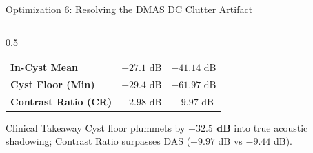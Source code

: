 \documentclass[aspectratio=169,10pt]{beamer}
\begin{document}
\begin{frame}{Optimization 6: Resolving the DMAS DC Clutter Artifact}
\begin{columns}[T]
\begin{column}{0.5\textwidth}
\begin{table}
\begin{tabular}{@{}lcc@{}}
          \midrule
          \textbf{In-Cyst Mean} & $-27.1\text{ dB}$ & \textbf{$-41.14\text{ dB}$} \\
          \textbf{Cyst Floor (Min)} & $-29.4\text{ dB}$ & \textbf{$-61.97\text{ dB}$} \\
          \textbf{Contrast Ratio (CR)} & $-2.98\text{ dB}$ & \textbf{$-9.97\text{ dB}$} \\
          \bottomrule
        \end{tabular}
      \end{table}
      \begin{alertblock}{Clinical Takeaway}
        \scriptsize
        Cyst floor plummets by \textbf{$-32.5$ dB} into true acoustic shadowing; Contrast Ratio surpasses DAS ($-9.97$ dB vs $-9.44$ dB).
      \end{alertblock}
    \end{column}
  \end{columns}
\end{frame}
\end{document}
